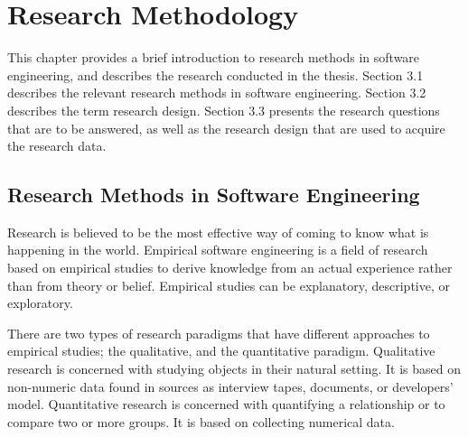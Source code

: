 
\chapter{Research Methodology}



This chapter provides a brief introduction to research methods in software engineering, and describes the research conducted in the thesis. Section 3.1 describes the relevant research methods in software engineering. Section 3.2 describes the term research design. Section 3.3 presents the research questions that are to be answered, as well as the research design that are used to acquire the research data.







\section{Research Methods in Software Engineering}
 Research is believed to be the most effective way of coming to know what is happening in the world\cite{bassey2003case}. Empirical software engineering is a field of research based on empirical studies to derive knowledge from an actual experience rather than from theory or belief\cite{empirical-research-SE}. Empirical studies can be explanatory, descriptive, or exploratory\cite{Wohlin:2000:ESE:330775}. 

 There are two types of research paradigms that have different approaches to empirical studies\cite{Wohlin:2000:ESE:330775}; the qualitative, and the quantitative paradigm. Qualitative research is concerned with studying objects in their natural setting\cite{Wohlin:2000:ESE:330775}. It is based on non-numeric data found in sources as interview tapes, documents, or developers' model. Quantitative research is concerned with quantifying a relationship or to compare two or more groups\cite{Wohlin:2000:ESE:330775}. It is based on collecting numerical data. 


